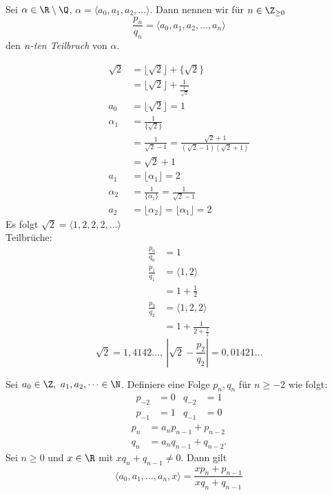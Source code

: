 \begin{defn*}[Teilbruch]
	Sei $\alpha \in \R \setminus \Q$, $\alpha = \langle a_0,a_1,a_2,\dotsc \rangle$. Dann nennen wir für $n \in \Z_{\geq0}$
	\[ \frac{p_n}{q_n} = \langle a_0,a_1,a_2,\dotsc,a_n \rangle \]
	den \emph{$\emph{n}$-ten Teilbruch} von $\alpha$.
\end{defn*}

\begin{exmp*}
	\begin{align*}
		\sqrt{2} &= \lfloor \sqrt{2}\rfloor + \{\sqrt{2}\}\\
		&= \lfloor \sqrt{2}\rfloor + \frac{1}{\frac{1}{\sqrt{2}}}\\
		a_0 &= \lfloor \sqrt{2} \rfloor = 1\\
		\alpha_1 &= \frac{1}{\{\sqrt{2}\}}\\
		&= \frac{1}{\sqrt{2} - 1} = \frac{\sqrt{2}+1}{(\sqrt{2} - 1)(\sqrt{2} + 1)}\\
		&= \sqrt{2} + 1\\
		a_1 &= \lfloor \alpha_1 \rfloor = 2\\
		\alpha_2 &= \frac{1}{\{ \alpha_1 \}} = \frac{1}{\sqrt{2} - 1}\\
		a_2 &= \lfloor \alpha_2 \rfloor = \lfloor \alpha_1 \rfloor = 2
	\end{align*}
	Es folgt $\sqrt{2} = \langle 1,2,2,2,\dotsc \rangle$\\
	Teilbrüche:
	\begin{align*}
		\frac{p_0}{q_0} &= 1 \\
		\frac{p_1}{q_1} &= \langle 1,2\rangle\\
		&= 1 + \frac{1}{2}\\
		\frac{p_2}{q_2} &= \langle 1,2,2\rangle\\
		&= 1 + \frac{1}{2 + \frac{1}{2}}
	\end{align*}
	\[ \sqrt{2} = 1,4142\dots,\ \left| \sqrt{2} - \frac{p_2}{q_2} \right| = 0,01421\dots \]
\end{exmp*}

\begin{thm}\autolabel
	Sei $a_0 \in \Z,\ a_1,a_2,\dots \in \N$. Definiere eine Folge $p_n,q_n$ für $n \geq -2$ wie folgt:
	\begin{align*}
		p_{-2} &= 0	&	q_{-2} &= 1\\
		p_{-1} &= 1 &	q_{-1} &= 0
	\end{align*}
	\begin{align*}
		p_n &= a_n p_{n-1} + p_{n-2}\\
		q_n &= a_n q_{n-1} + q_{n-2}.
	\end{align*}
	Sei $n \geq 0$ und $x \in \R$ mit $x q_n + q_{n-1} \neq 0$. Dann gilt
	\[ \langle a_0,a_1,\dotsc,a_n,x\rangle = \frac{x p_n + p_{n-1}}{x q_n + q_{n-1}} \]
\end{thm}

